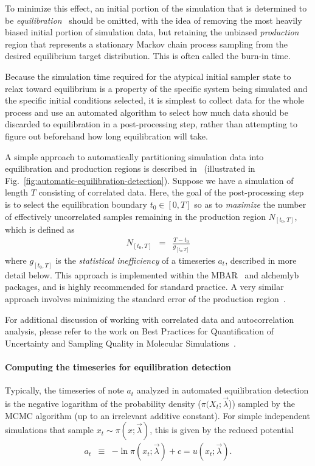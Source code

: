 \documentclass[9pt,bestpractices]{livecoms}
\begin{document}
To minimize this effect, an initial portion of the simulation that is determined to be  \emph{equilibration}~\cite{braun2019best} should be omitted, with the idea of removing the most heavily biased initial portion of simulation data, but retaining the unbiased \emph{production} region that represents a stationary Markov chain process sampling from the desired equilibrium target distribution. This is often called the burn-in time. 

Because the simulation time required for the atypical initial sampler state to relax toward equilibrium is a property of the specific system being simulated and the specific initial conditions selected, it is simplest to collect data for the whole process and use an automated algorithm to select how much data should be discarded to equilibration in a post-processing step, rather than attempting to figure out beforehand how long equilibration will take. 

A simple approach to automatically partitioning simulation data into equilibration and production regions is described in~\cite{chodera2016simple} (illustrated in Fig.~\ref{fig:automatic-equilibration-detection}).
Suppose we have a simulation of length $T$ consisting of correlated data.
Here, the goal of the post-processing step is to select the equilibration boundary $t_0 \in [0, T]$ so as to \emph{maximize} the number of effectively uncorrelated samples remaining in the production region $N_{[t_0,T]}$, which is defined as
\begin{eqnarray}
N_{[t_0,T]} &=& \frac{T - t_0}{g_{[t_0,T]}}
\end{eqnarray}
where $g_{[t_0,T]}$ is the \emph{statistical inefficiency} of a timeseries $a_t$, described in more detail below.
This approach is implemented within the MBAR~\cite{kylebeauchamp2019choderalab} and alchemlyb~\cite{daviddotson2019alchemistry} packages, and is highly recommended for standard practice. A very similar approach involves minimizing the standard error of the production region~\cite{whiteEffectiveTruncationHeuristic1997, sprattHeuristicsStartupProblem1998, hoadAutomatingWarmupLength2010, clarkRobustAutomatedTruncation2025}.

For additional discussion of working with correlated data and autocorrelation analysis, please refer to the work on Best Practices for Quantification of Uncertainty and Sampling Quality in Molecular Simulations~\cite{grossfield2018best}.


\paragraph{Computing the timeseries for equilibration detection}
Typically, the timeseries of note $a_t$ analyzed in automated equilibration detection is the negative logarithm of the probability density ($\pi(X_t; \vec{\lambda}$)) sampled by the MCMC algorithm (up to an irrelevant additive constant).
For simple independent simulations that sample $x_t \sim \pi(x ; \vec{\lambda})$, this is given by the reduced potential
\begin{eqnarray}
a_t &\equiv& - \ln \pi(x_t; \vec{\lambda}) + c = u(x_t; \vec{\lambda}) .
\end{eqnarray}
\end{document}

